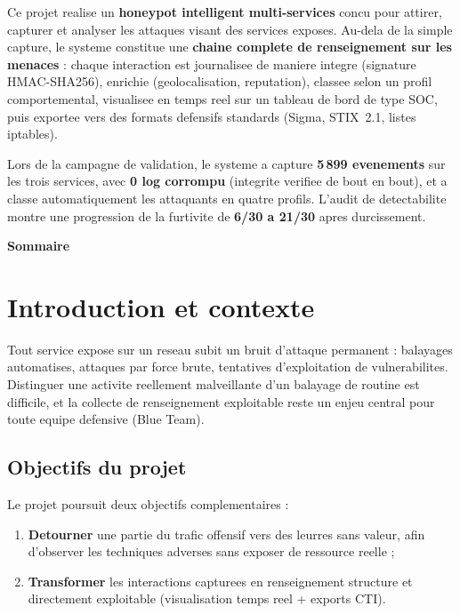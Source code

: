 \documentclass[11pt,a4paper]{article}
\begin{document}
\begin{resumebox}
Ce projet realise un \textbf{honeypot intelligent multi-services} concu pour attirer,
capturer et analyser les attaques visant des services exposes. Au-dela de la simple
capture, le systeme constitue une \textbf{chaine complete de renseignement sur les
menaces} : chaque interaction est journalisee de maniere integre (signature
HMAC-SHA256), enrichie (geolocalisation, reputation), classee selon un profil
comportemental, visualisee en temps reel sur un tableau de bord de type SOC, puis
exportee vers des formats defensifs standards (Sigma, STIX~2.1, listes iptables).
\medskip

Lors de la campagne de validation, le systeme a capture \textbf{5\,899 evenements} sur
les trois services, avec \textbf{0 log corrompu} (integrite verifiee de bout en bout),
et a classe automatiquement les attaquants en quatre profils. L'audit de detectabilite
montre une progression de la furtivite de \textbf{6/30 a 21/30} apres durcissement.
\end{resumebox}

\medskip
{\sffamily\large\bfseries\color{primary}Sommaire}
\vspace{-0.4cm}
\renewcommand{\contentsname}{}
\tableofcontents
\newpage

\section{Introduction et contexte}
Tout service expose sur un reseau subit un bruit d'attaque permanent : balayages
automatises, attaques par force brute, tentatives d'exploitation de vulnerabilites.
Distinguer une activite reellement malveillante d'un balayage de routine est difficile,
et la collecte de renseignement exploitable reste un enjeu central pour toute equipe
defensive (Blue Team).

\subsection{Objectifs du projet}
Le projet poursuit deux objectifs complementaires :
\begin{enumerate}[leftmargin=1.5em,itemsep=2pt]
  \item \textbf{Detourner} une partie du trafic offensif vers des leurres sans valeur,
        afin d'observer les techniques adverses sans exposer de ressource reelle ;
  \item \textbf{Transformer} les interactions capturees en renseignement structure et
        directement exploitable (visualisation temps reel + exports CTI).
\end{enumerate}
\end{document}
